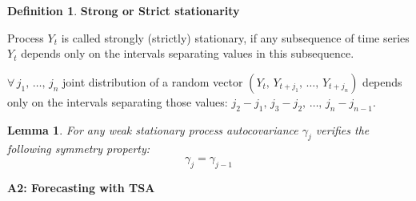 \documentclass[12pt, english]{article}
\numberwithin{equation}{section} %
\theoremstyle{plain}
\newtheorem{lemma}{Lemma}[subsection]
\theoremstyle{definition}
\newtheorem{definition}{Definition}[subsection]
\begin{document}
\begin{definition}
	\label{strong_stationarity}
	\textbf{Strong or Strict stationarity}
	
	Process $Y_t$ is called strongly (strictly) stationary, if any subsequence of time series $Y_t$ depends only on the intervals separating values in this subsequence.
	
	$\forall \, j_1,\, \dots,\, j_n$ joint distribution of a random vector $(Y_t,\, Y_{t+j_1},\, \dots,\, Y_{t+j_n})$ depends only on the intervals separating those values: $j_2 - j_1,\, j_3 - j_2,\, \dots,\, j_n - j_{n-1}$.
\end{definition}

\begin{lemma}
	For any weak stationary process autocovariance $\gamma_j$ verifies the following symmetry property:
	\[
		\gamma_j = \gamma_{j-1}
	\] 
\end{lemma}


\newpage
\begin{center}
	\huge{\textbf{A2: Forecasting with TSA}}
\end{center}


\end{document}
